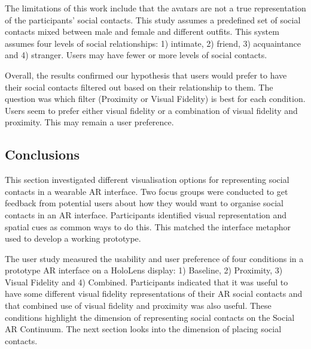 The limitations of this work include that the avatars are not a true representation of the participants' social contacts. This study assumes a predefined set of social contacts mixed between male and female and different outfits. This system assumes four levels of social relationships: 1) intimate, 2) friend, 3) acquaintance and 4) stranger. Users may have fewer or more levels of social contacts. 

Overall, the results confirmed our hypothesis that users would prefer to have their social contacts filtered out based on their relationship to them. The question was which filter (Proximity or Visual Fidelity) is best for each condition. Users seem to prefer either visual fidelity or a combination of visual fidelity and proximity. This may remain a user preference. 


\subsection{Conclusions}

This section investigated different visualisation options for representing social contacts in a wearable AR interface. Two focus groups were conducted to get feedback from potential users about how they would want to organise social contacts in an AR interface. Participants identified visual representation and spatial cues as common ways to do this. This matched the interface metaphor used to develop a working prototype.

The user study measured the usability and user preference of four conditions in a prototype AR interface on a HoloLens display: 1) Baseline, 2) Proximity, 3) Visual Fidelity and 4) Combined. Participants indicated that it was useful to have some different visual fidelity representations of their AR social contacts and that combined use of visual fidelity and proximity was also useful. These conditions highlight the dimension of representing social contacts on the Social AR Continuum. The next section looks into the dimension of placing social contacts. 

